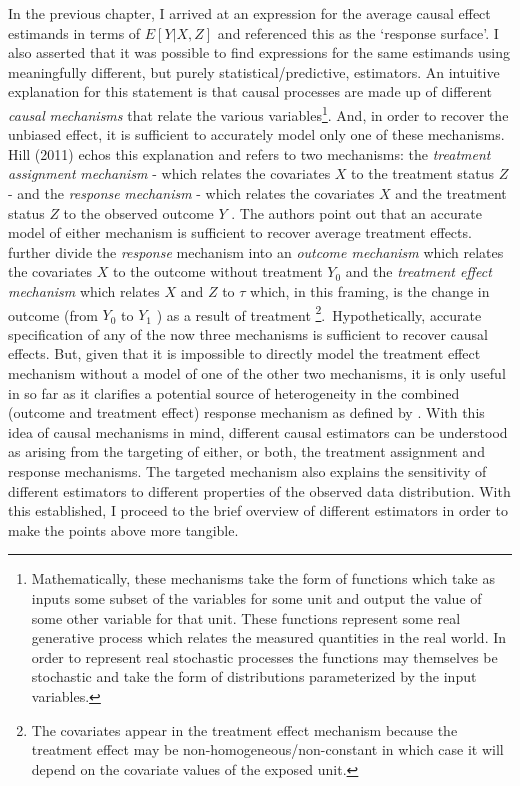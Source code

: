 \documentclass[../main.tex]{subfiles}
\begin{document}
\vspace{\baselineskip}
In the previous chapter, I arrived at an expression for the average causal effect estimands in terms of  \( E \left[ Y  \vert  X, Z \right]  \)  and referenced this as the ‘response surface’. I also asserted that it was possible to find expressions for the same estimands using meaningfully different, but purely statistical/predictive, estimators. An intuitive explanation for this statement is that causal processes are made up of different \textit{causal} \textit{mechanisms} that relate the various variables\footnote{ Mathematically, these mechanisms take the form of functions which take as inputs some subset of the variables for some unit and output the value of some other variable for that unit. These functions represent some real generative process which relates the measured quantities in the real world. In order to represent real stochastic processes the functions may themselves be stochastic and take the form of distributions parameterized by the input variables. }. And, in order to recover the unbiased effect, it is sufficient to accurately model only one of these mechanisms. Hill (2011) echos this explanation and refers to two mechanisms: the \textit{treatment assignment} \textit{mechanism} - which relates the covariates  \( X \) to the treatment status  \( Z \)  - and the \textit{response} \textit{mechanism} - which relates the covariates  \( X \)  and the treatment status  \( Z \)  to the observed outcome  \( Y \) . The authors point out that an accurate model of either mechanism is sufficient to recover average treatment effects. \textcite{Kunzel2019MetalearnersLearning} further divide the \textit{response} mechanism into an \textit{outcome mechanism} which relates the covariates  \( X \) to the outcome without treatment  \( Y_{0} \) and the \textit{treatment effect mechanism} which relates  \( X \) and  \( Z \) to  \(  \tau \) which, in this framing, is the change in outcome (from  \( Y_{0} \) to  \( Y_{1} \) ) as a result of treatment \footnote{ The covariates appear in the treatment effect mechanism because the treatment effect may be non-homogeneous/non-constant in which case it will depend on the covariate values of the exposed unit. }.\  Hypothetically, accurate specification of any of the now three mechanisms is sufficient to recover causal effects. But, given that it is impossible to directly model the treatment effect mechanism without a model of one of the other two mechanisms, it is only useful in so far as it clarifies a potential source of heterogeneity in the combined (outcome and treatment effect) response mechanism as defined by \textcite{Hill2011BayesianInference}. With this idea of causal mechanisms in mind, different causal estimators can be understood as arising from the targeting of either, or both, the treatment assignment and response mechanisms. The targeted mechanism also explains the sensitivity of different estimators to different properties of the observed data distribution. With this established, I proceed to the brief overview of different estimators in order to make the points above more tangible.\par
\end{document}
